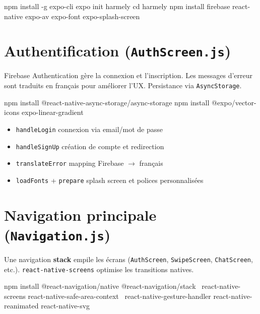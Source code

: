 \documentclass[11pt,a4paper]{article}
\begin{document}
\begin{codebox}[listing options={style=jsstyle,language=bash}]
npm install -g expo-cli
expo init harmely
cd harmely
npm install firebase react-native expo-av expo-font expo-splash-screen
\end{codebox}

\section{Authentification (\texttt{AuthScreen.js})}

Firebase Authentication gère la connexion et l'inscription. Les messages d'erreur sont traduits en français pour améliorer l'UX. Persistance via \texttt{AsyncStorage}.

\begin{codebox}[listing options={style=jsstyle,language=bash}]
npm install @react-native-async-storage/async-storage
npm install @expo/vector-icons expo-linear-gradient
\end{codebox}

\begin{stepbox}[title={\faLock~Fonctions clés}]
\begin{itemize}
  \item \texttt{handleLogin} \textemdash{} connexion via email/mot de passe
  \item \texttt{handleSignUp} \textemdash{} création de compte et redirection
  \item \texttt{translateError} \textemdash{} mapping Firebase $\rightarrow$ français
  \item \texttt{loadFonts} + \texttt{prepare} \textemdash{} splash screen et polices personnalisées
\end{itemize}
\end{stepbox}

\section{Navigation principale (\texttt{Navigation.js})}

Une navigation \textbf{stack} empile les écrans (\texttt{AuthScreen}, \texttt{SwipeScreen}, \texttt{ChatScreen}, etc.). \texttt{react-native-screens} optimise les transitions natives.

\begin{codebox}[listing options={style=jsstyle,language=bash}]
npm install @react-navigation/native @react-navigation/stack \
  react-native-screens react-native-safe-area-context \
  react-native-gesture-handler react-native-reanimated react-native-svg
\end{codebox}
\end{document}
